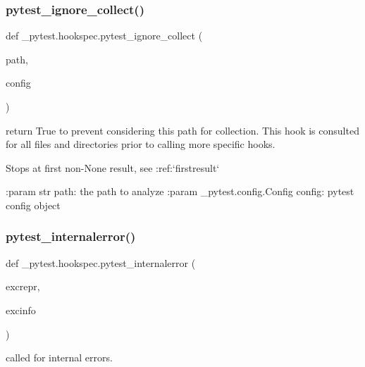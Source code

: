\subsubsection{\texorpdfstring{pytest\+\_\+ignore\+\_\+collect()}{pytest\_ignore\_collect()}}
{\footnotesize\ttfamily def \+\_\+pytest.\+hookspec.\+pytest\+\_\+ignore\+\_\+collect (\begin{DoxyParamCaption}\item[{}]{path,  }\item[{}]{config }\end{DoxyParamCaption})}

\begin{DoxyVerb}return True to prevent considering this path for collection.
This hook is consulted for all files and directories prior to calling
more specific hooks.

Stops at first non-None result, see :ref:`firstresult`

:param str path: the path to analyze
:param _pytest.config.Config config: pytest config object
\end{DoxyVerb}
 \mbox{\label{namespace__pytest_1_1hookspec_a61c213424357f9ba101b7d546f418111}} 
\subsubsection{\texorpdfstring{pytest\+\_\+internalerror()}{pytest\_internalerror()}}
{\footnotesize\ttfamily def \+\_\+pytest.\+hookspec.\+pytest\+\_\+internalerror (\begin{DoxyParamCaption}\item[{}]{excrepr,  }\item[{}]{excinfo }\end{DoxyParamCaption})}

\begin{DoxyVerb}called for internal errors. \end{DoxyVerb}
 \mbox{\label{namespace__pytest_1_1hookspec_ac7dae502fe8690c2398c77d95f3ba50e}} 
